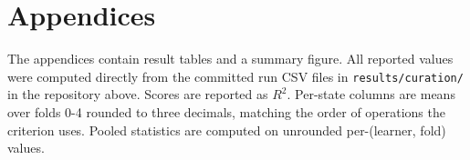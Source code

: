 \documentclass{article}
\begin{document}







\appendix
\newpage

\setcounter{figure}{0}
\setcounter{table}{0}

\section*{Appendices}

\noindent The appendices contain result tables and a summary figure. All reported values were computed directly from the committed run CSV files in \texttt{results/curation/} in the repository above. Scores are reported as $R^2$. Per-state columns are means over folds 0-4 rounded to
three decimals, matching the order of operations the criterion uses. Pooled statistics are
computed on unrounded per-(learner, fold) values.
\end{document}
